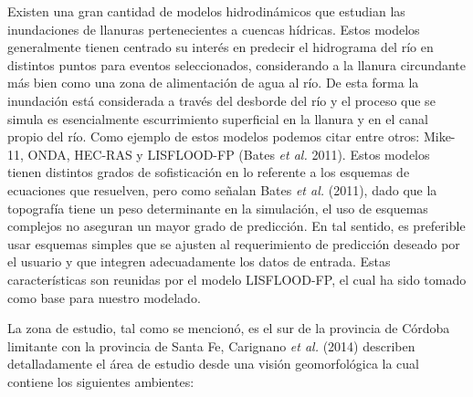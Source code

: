 \documentclass[10pt,a4paper, twoside]{report}
\begin{document}
Existen una gran cantidad de modelos hidrodinámicos que estudian las inundaciones de llanuras pertenecientes a cuencas hídricas. Estos modelos generalmente tienen centrado su interés en predecir el hidrograma del río en distintos puntos para eventos seleccionados, considerando a la llanura circundante más bien como una zona de alimentación de agua al río. De esta forma la inundación está considerada a través del desborde del río y el proceso que se simula es esencialmente escurrimiento superficial en la llanura y en el canal propio del río. Como ejemplo de estos modelos podemos citar entre otros: Mike-11, ONDA, HEC-RAS y LISFLOOD-FP (Bates \textit{et al.} 2011). Estos modelos tienen distintos grados de sofisticación en lo referente a los esquemas de ecuaciones que resuelven, pero como señalan Bates \textit{et al.} (2011), dado que la topografía tiene un peso determinante en la simulación, el uso de esquemas complejos no aseguran un mayor grado de predicción. En tal sentido, es preferible usar esquemas simples que se ajusten al requerimiento de predicción deseado por el usuario y que integren adecuadamente los datos de entrada. Estas características son reunidas por el modelo LISFLOOD-FP, el cual ha sido tomado como base para nuestro modelado.

La zona de estudio, tal como se mencionó, es el sur de la provincia de Córdoba limitante con la provincia de Santa Fe, Carignano \textit{et al.} (2014) describen detalladamente el área de estudio desde una visión geomorfológica la cual contiene los siguientes ambientes:
\end{document}
